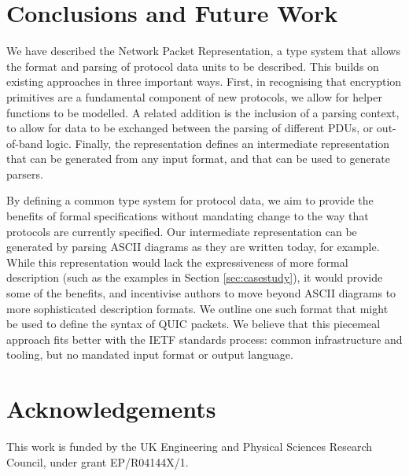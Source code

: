 \documentclass[10pt,sigconf]{acmart}
\begin{document}
\section{Conclusions and Future Work}
\label{sec:conclusion}

We have described the Network Packet Representation, a type system that
allows the format and parsing of protocol data units to be described.
This builds on existing approaches in three important ways. First, in
recognising that encryption primitives are a fundamental component of new protocols, we
allow for helper functions to be modelled. A related addition is the inclusion
of a parsing context, to allow for data to be exchanged
between the parsing of different PDUs, or out-of-band logic. Finally, the representation
defines an intermediate representation that can be generated from any input format, and
that can be used to generate parsers.


By defining a common type system for protocol data, we aim to provide the
benefits of formal specifications without mandating change to the way that
protocols are currently specified.
Our intermediate representation can be generated by parsing ASCII diagrams
as they are written today, for example.
While this representation would lack the expressiveness of more formal
description (such as the examples in Section \ref{sec:casestudy}), it would
provide some of the benefits, and incentivise authors to move beyond ASCII
diagrams to more sophisticated description formats.
We outline one such format that might be used to define the syntax of QUIC
packets.
We believe that this piecemeal approach fits better with the IETF standards
process: common infrastructure and tooling, but no mandated input format or
output language.

\section*{Acknowledgements}

This work is funded by the UK Engineering and Physical Sciences Research Council, under
grant EP/R04144X/1.

\balance


\end{document}
